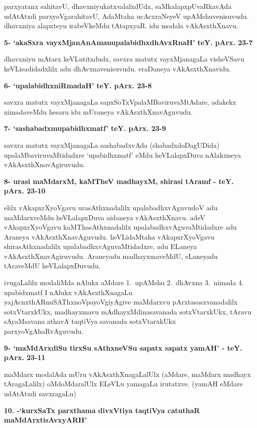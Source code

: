 \smallskip
parxyatanx sahitavU, dhavxniyukatxvalalxdUdx, saMkalapxpUvaRkavAda udAtAtxdi parxyoVgarahitavU, AdaM\-taha ucAcxraNeyeV upAMshuvenisuvudu. dhavxniya alapxteyu irabeVkeMdu tAtapxyaR. idu modala vAkAsxthXnavu.

\eject

\noindent
\textbf{5- `akaSxra vayxMjanAnAmanupalabidhxdhAvxRnaH' teY. pArx. 23-7}

\smallskip
dhavxniyu mAtarx keVLutitxdudx, savxra matutx vayxMjanagaLa visheVSavu keVLisadidadxlilx adu dhAvxnavenisuvudu. eraDaneya vAkAsxthXnavidu.

\medskip
\noindent
\textbf{6- `upalabidhxniRmadaH' teY. pArx. 23-8}

\smallskip
savxra matutx vayxMjanagaLa sapxSoTxVpalaMBaviruvaMtAdare, adakekx nimadaveMdu hesaru idu mUra\-neya vAkAsxthXnavAguvudu.


\medskip
\noindent
\textbf{7- `sashabadxmupabidhxmatf' teY. pArx. 23-9}

\smallskip
savxra matutx vayxMjanagaLa sashabadxvAda (shabadxdoDagUDida) upalaMbaviruvaMtidadxre `upabidhxmatf' eMdu heVLalapxDuva nAlakxneya vAkAsxthXnavAgiruvudu.

\medskip
\noindent
\textbf{8- urasi maMdarxM, kaMTheV madhayxM, shirasi tAramf - teY. pArx. 23-10}

\smallskip
elilx vAkapxrXyoVgavu urasAthxnadalilx upalabadhxvAguvudoV adu maMdarx\-veMdu heVLalapxDuva aida\-neya vAkAsxthXnavu. adeV vAkapxrXyoVgavu kaMThasAthxnadalilx upalabadhxvAguvaMtidadxre adu Araneya vAkAsxthX\-na\-vAguvudu. heVLidaMtaha vAkapxrXyoVgavu shirasAthxnadalilx upalabadhxvAguvaMtidadxre, adu ELaneya vAkAsxthXna\-vAgiruvudu. Araneyadu madhayxmaveMdU, eLaneyadu tAraveMdU heVLalapxDuvudu.

ivugaLalilx modaliMda nAlukx aMdare 1.~upAMshu 2.~dhAvxna 3.~\hbox{nimada} 4. upabidxmatf I nAlukx vAkAsxthXnagaLu yajAcnxthARnuSAThxnoVpayoVgiyAgive maMdarxvu pArxtasasxvanadalilx sotxVtarxkUkx, madhayx\-mavu mAdhayxMdinasavanada sotxVtarxkUkx, tAravu sAyaMsavana athavA taqtiVya savanada sotxVtarxkUkx parxyoV\-gAhaRvAgu\-vudu.

\medskip
\noindent
\textbf{9- `maMdArxdiSu tirxSu sAthxneVSu sapatx sapatx yamAH' - teY. pArx. 23-11}

\smallskip
maMdarx modalAda mUru vAkAsxthXnagaLalUlx (aMdare, maMdarx madhayx tAragaLalilx) oMdoMdaralUlx ELeVLu yamagaLu irutatxve. (yamAH eMdare udAtAtxdi savxragaLu)


\medskip
\noindent
\textbf{10. -`kurxSaTx parxthama divxVtiya taqtiVya catuthaR maMdArxtisAvxyARH'}

